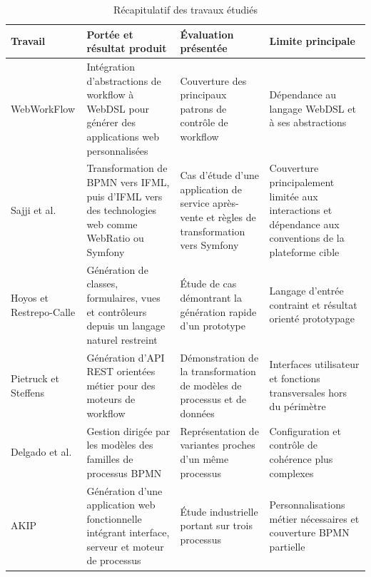 \begin{table}[H]
\small
\centering
\caption{Récapitulatif des travaux étudiés}
\label{tab:chap2-travaux-etudies}
\renewcommand{\arraystretch}{1.15}
\begin{tabularx}{\textwidth}{p{2.4cm}p{3.8cm}p{3.2cm}X}
\toprule
\textbf{Travail} & \textbf{Portée et résultat produit} & \textbf{Évaluation présentée} & \textbf{Limite principale} \\
\midrule
WebWorkFlow \cite{hemel2008} & Intégration d'abstractions de workflow à WebDSL pour générer des applications web personnalisées & Couverture des principaux patrons de contrôle de workflow & Dépendance au langage WebDSL et à ses abstractions \\
Sajji et al. \cite{sajji2022,sajji2023,sajji2025} & Transformation de BPMN vers IFML, puis d'IFML vers des technologies web comme WebRatio ou Symfony & Cas d'étude d'une application de service après-vente et règles de transformation vers Symfony & Couverture principalement limitée aux interactions et dépendance aux conventions de la plateforme cible \\
Hoyos et Restrepo-Calle \cite{hoyos2017} & Génération de classes, formulaires, vues et contrôleurs depuis un langage naturel restreint & Étude de cas démontrant la génération rapide d'un prototype & Langage d'entrée contraint et résultat orienté prototypage \\
Pietruck et Steffens \cite{pietruck2020} & Génération d'API REST orientées métier pour des moteurs de workflow & Démonstration de la transformation de modèles de processus et de données & Interfaces utilisateur et fonctions transversales hors du périmètre \\
Delgado et al. \cite{delgado2022} & Gestion dirigée par les modèles des familles de processus BPMN & Représentation de variantes proches d'un même processus & Configuration et contrôle de cohérence plus complexes \\
AKIP \cite{neto2022} & Génération d'une application web fonctionnelle intégrant interface, serveur et moteur de processus & Étude industrielle portant sur trois processus & Personnalisations métier nécessaires et couverture BPMN partielle \\

\end{tabularx}
\end{table}
